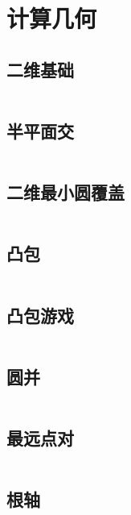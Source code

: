 \section{计算几何}
\subsection{二维基础}
\inputminted[breaklines]{cpp}{./computational_geometry/two_dimensions_basic.cpp}
\subsection{半平面交}
\inputminted[breaklines]{cpp}{./computational_geometry/half_plane_intersection.cpp}
\subsection{二维最小圆覆盖}
\inputminted[breaklines]{cpp}{./computational_geometry/2D-minimum-circle-coverage.cpp}
\subsection{凸包}
\inputminted[breaklines]{cpp}{./computational_geometry/convex_hull.cpp}
\subsection{凸包游戏}
\inputminted[breaklines]{cpp}{./computational_geometry/convex_hull_game.cpp}
\subsection{圆并}
\inputminted[breaklines]{cpp}{./computational_geometry/circle_union.cpp}
\subsection{最远点对}
\inputminted[breaklines]{cpp}{./computational_geometry/farthest_point_pair.cpp}
\subsection{根轴}
